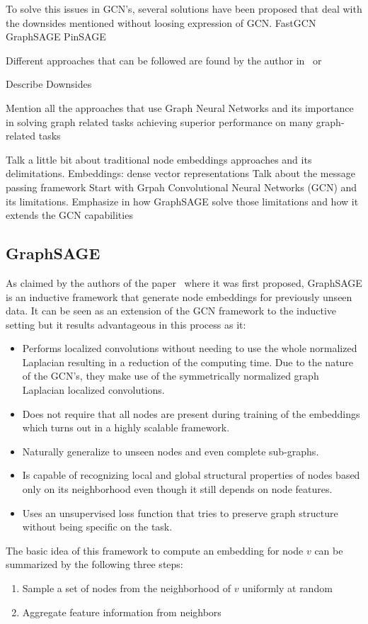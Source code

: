 To solve this issues in GCN's, several solutions have been proposed that deal with the downsides mentioned without loosing expression of GCN.
FastGCN
GraphSAGE 
PinSAGE

Different approaches that can be followed are found by the author in~\cite{gnnsurvey} or~\cite{hamilton}


Describe Downsides

Mention all the approaches that use Graph Neural Networks and its importance in solving graph related tasks
achieving superior performance on many graph-related tasks


Talk a little bit about traditional node embeddings approaches and its delimitations.
 Embeddings: dense vector representations
Talk about the message passing framework
Start with Grpah Convolutional Neural Networks (GCN) and its limitations. Emphasize in how GraphSAGE solve those limitations and how it extends the GCN capabilities

\subsection{GraphSAGE}
As claimed by the authors of the paper~\cite{graphsage} where it was first proposed, GraphSAGE is an inductive framework that generate node embeddings for previously unseen data. It can be seen as an extension of the GCN framework to the inductive setting but it results advantageous in this process as it:
\begin{itemize}
    \item Performs localized convolutions without needing to use the whole normalized Laplacian resulting in a reduction of the computing time. Due to the nature of the GCN's, they make use of the symmetrically normalized graph Laplacian localized convolutions.
    \item Does not require that all nodes are present during training of the embeddings which turns out in a highly scalable framework.
    \item Naturally generalize to unseen nodes and even complete sub-graphs.
    \item Is capable of recognizing local and global structural properties of nodes based only on its neighborhood even though it still depends on node features.
    \item Uses an unsupervised loss function that tries to preserve graph structure without being specific on the task.
\end{itemize}

The basic idea of this framework to compute an embedding for node $v$ can be summarized by the following three steps:
\begin{enumerate}
    \item Sample a set of nodes from the neighborhood of $v$ uniformly at random
    \item Aggregate feature information from neighbors
\end{enumerate}

